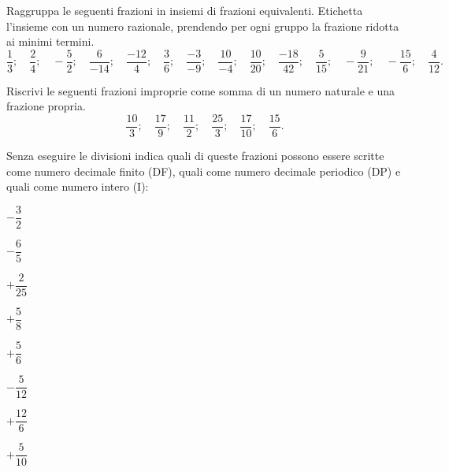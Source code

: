  \subsubsection*{}

\begin{esercizio}
 \label{ese:3.17}
Raggruppa le seguenti frazioni in insiemi di frazioni equivalenti.
Etichetta l'insieme con un numero razionale, prendendo per ogni gruppo la 
frazione ridotta ai minimi termini.
{\footnotesize
\[\frac{1}{3};\quad \frac{2}{4};\quad -\frac{5}{2};\quad 
  \frac{6}{-14};\quad \frac{-12}{4};\quad \frac{3}{6};\quad 
  \frac{-3}{-9};\quad \frac{10}{-4};\quad \frac{10}{20};\quad 
  \frac{-18}{42};\quad \frac{5}{15};\quad -\frac{9}{21};\quad 
-\frac{15}{6};\quad \frac{4}{12}.\]}
\end{esercizio}

\begin{esercizio}
 \label{ese:3.18}
 Riscrivi le seguenti frazioni improprie come somma di un numero naturale e 
 una frazione propria.
\[\frac{10}{3};\quad \frac{17}{9};\quad \frac{11}{2};\quad 
  \frac{25}{3};\quad \frac{17}{10};\quad \frac{15}{6}.\]
\end{esercizio}


\begin{esercizio}
 \label{ese:3.19}
 Senza eseguire le divisioni indica quali di queste frazioni possono essere 
 scritte come numero decimale finito (DF), quali come numero decimale 
 periodico (DP) e quali come numero intero (I):
 
\begin{htmulticols}{2}
 \TabPositions{15mm}
 \begin{enumeratees}
\spazielenx
 \item \(-\dfrac{3}{2}~\)~~~~~~~~~
 \item \(-\dfrac{6}{5}~\)~~~~~~~~~
 \item \(+\dfrac{2}{25}\)~~~~~~~~~
 \item \(+\dfrac{5}{8}~\)~~~~~~~~~
 \item \(+\dfrac{5}{6}~\)~~~~~~~~~
 \item \(-\dfrac{5}{12}\)~~~~~~~~~
 \item \(+\dfrac{12}{6}\)~~~~~~~~~
 \item \(+\dfrac{5}{10}\)~~~~~~~~~
 \end{enumeratees}
\end{htmulticols}
\end{esercizio}

